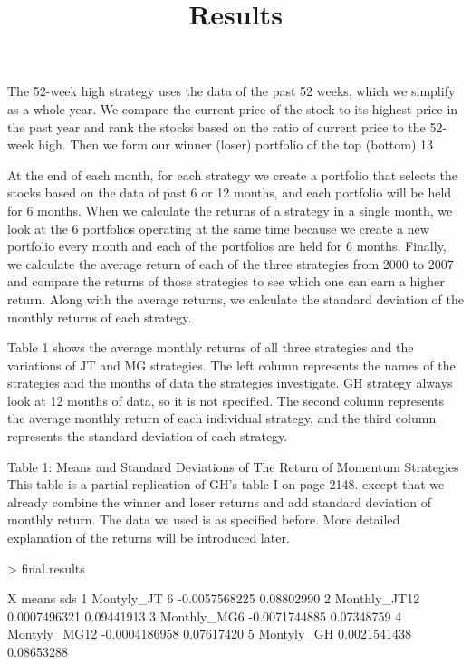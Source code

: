 \documentclass{article}
\begin{document}
The 52-week high strategy uses the data of the past 52 weeks, which we simplify as a whole year. We compare the current price of the stock to its highest price in the past year and rank the stocks based on the ratio of current price to the 52-week high. Then we form our winner (loser) portfolio of the top (bottom) 13%

At the end of each month, for each strategy we create a portfolio that selects the stocks based on the data of past 6 or 12 months, and each portfolio will be held for 6 months. When we calculate the returns of a strategy in a single month, we look at the 6 portfolios operating at the same time because we create a new portfolio every month and each of the portfolios are held for 6 months. Finally, we calculate the average return of each of the three strategies from 2000 to 2007 and compare the returns of those strategies to see which one can earn a higher return. Along with the average returns, we calculate the standard deviation of the monthly returns of each strategy. 

\title{\Large Results}


Table 1 shows the average monthly returns of all three strategies and the variations of JT and MG strategies. The left column represents the names of the strategies and the months of data the strategies investigate. GH strategy always look at 12 months of data, so it is not specified. The second column represents the average monthly return of each individual strategy, and the third column represents the standard deviation of each strategy.


\begin{center}
Table 1: Means and Standard Deviations of The Return of Momentum Strategies
\small This table is a partial replication of GH’s table I on page 2148. except that we already combine the winner and loser returns and add standard deviation of monthly return. The data we used is as specified before. More detailed explanation of the returns will be introduced later.

\begin{Schunk}
\begin{Sinput}
> final.results
\end{Sinput}
\begin{Soutput}
             X         means        sds
1 Montyly_JT 6 -0.0057568225 0.08802990
2 Monthly_JT12  0.0007496321 0.09441913
3  Monthly_MG6 -0.0071744885 0.07348759
4 Montyly_MG12 -0.0004186958 0.07617420
5   Montyly_GH  0.0021541438 0.08653288
\end{Soutput}
\end{Schunk}
\end{center}
\end{document}
